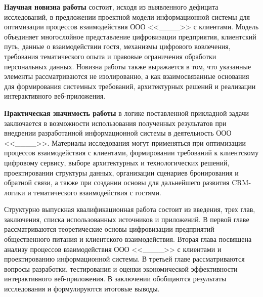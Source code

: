 \textbf{Научная новизна работы} состоит, исходя из выявленного дефицита исследований, в предложении проектной модели информационной системы для оптимизации процессов взаимодействия ООО <<\_\_\_\_>> с клиентами. Модель объединяет многослойное представление цифровизации предприятия, клиентский путь, данные о взаимодействии гостя, механизмы цифрового вовлечения, требования тематического опыта и правовые ограничения обработки персональных данных. Новизна работы также выражается в том, что указанные элементы рассматриваются не изолированно, а как взаимосвязанные основания для формирования системных требований, архитектурных решений и реализации интерактивного веб-приложения.

\textbf{Практическая значимость работы} в логике поставленной прикладной задачи заключается в возможности использования полученных результатов при внедрении разработанной информационной системы в деятельность ООО <<\_\_\_\_>>. Материалы исследования могут применяться при оптимизации процессов взаимодействия с клиентами, формировании требований к клиентскому цифровому сервису, выборе архитектурных и технологических решений, проектировании структуры данных, организации сценариев бронирования и обратной связи, а также при создании основы для дальнейшего развития CRM-логики и тематического взаимодействия с гостями.

Структурно выпускная квалификационная работа состоит из введения, трех глав, заключения, списка использованных источников и приложений. В первой главе рассматриваются теоретические основы цифровизации предприятий общественного питания и клиентского взаимодействия. Вторая глава посвящена анализу процессов взаимодействия ООО <<\_\_\_\_>> с клиентами и проектированию информационной системы. В третьей главе рассматриваются вопросы разработки, тестирования и оценки экономической эффективности интерактивного веб-приложения. В заключении обобщаются результаты исследования и формулируются итоговые выводы.
